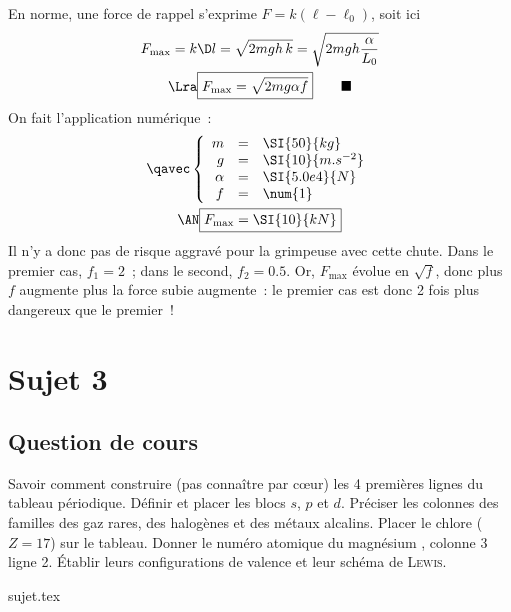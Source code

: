\documentclass[a4paper, 11pt]{book}
\newcommand{\qed}{\tag*{$\blacksquare$}}
\renewcommand{\a}[0]{\alpha}
\begin{document}
{En norme, une force de rappel s'exprime $F = k(\ell -\ell_0)$, soit
    ici
    \begin{gather*}
        F_{\max} = k\D l = \sqrt{2mgh\,k} = \sqrt{2mgh\frac{\a}{L_0}}
        \\\Lra
        \boxed{F_{\max} = \sqrt{2mg\a f}}
        \qed
    \end{gather*}
}
{On fait l'application numérique~:
    \begin{gather*}
        \qavec
        \left\{
            \begin{array}{rcl}
                m & = & \SI{50}{kg}\\
                g & = & \SI{10}{m.s^{-2}}\\
                \a & = & \SI{5.0e4}{N}\\
                f & = & \num{1}
            \end{array}
        \right.\\
        \AN
        \boxed{F_{\max} = \SI{10}{kN}}
    \end{gather*}
    Il n'y a donc pas de risque aggravé pour la grimpeuse avec cette chute.
}
{Dans le premier cas, $f_1 = 2$~; dans le second, $f_2 = \num{0.5}$. Or,
$F_{\max}$ évolue en $\sqrt{f}$, donc plus $f$ augmente plus la force
subie augmente~: le premier cas est donc 2 fois plus dangereux que le
premier~!
}

\chapter{Sujet 3}
\section{Question de cours}

Savoir comment construire (pas connaître par cœur) les 4 premières
lignes du tableau périodique. Définir et placer les blocs $s$, $p$ et
$d$. Préciser les colonnes des familles des gaz rares, des halogènes et
des métaux alcalins. Placer le chlore  ($Z = 17$) sur le tableau. Donner
le numéro atomique du magnésium , colonne 3 ligne 2. Établir leurs
configurations de valence et leur schéma de \textsc{Lewis}.

\resetQ
{sujet.tex}

\label{LastPage}
\end{document}
